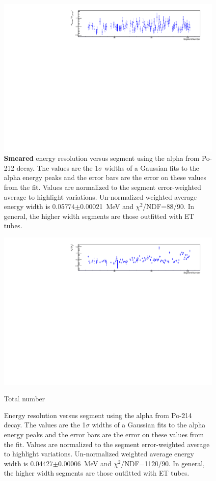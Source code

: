 \begin{figure}[!h]
\centering
\includegraphics[width=1.05\textwidth]{figures/PubBiPo212EsmearresvsCell.pdf}
\caption{\label{fig:EsmearresvsCell212}{\bf Smeared} energy resolution versus segment using the alpha from Po-212 decay. The values are the 1$\sigma$ widths of a Gaussian fits to the alpha energy peaks and the error bars are the error on these values from the fit. Values are normalized to the segment error-weighted average to highlight variations. Un-normalized weighted average energy width is 0.05774$\pm$0.00021~MeV and $\chi^2$/NDF=88/90.  In general, the higher width segments are those outfitted with ET tubes.}
\end{figure}
\begin{figure}[!h]
\centering
\includegraphics[width=1.05\textwidth]{figures/PubBiPo214EresvsCell.pdf}
\caption{\label{fig:EresvsCell214}Energy resolution versus segment using the alpha from Po-214 decay. The values are the 1$\sigma$ widths of a Gaussian fits to the alpha energy peaks and the error bars are the error on these values from the fit. Values are normalized to the segment error-weighted average to highlight variations. Un-normalized weighted average energy width is 0.04427$\pm$0.00006~MeV and $\chi^2$/NDF=1120/90.  In general, the higher width segments are those outfitted with ET tubes.}Total number
\end{figure}
